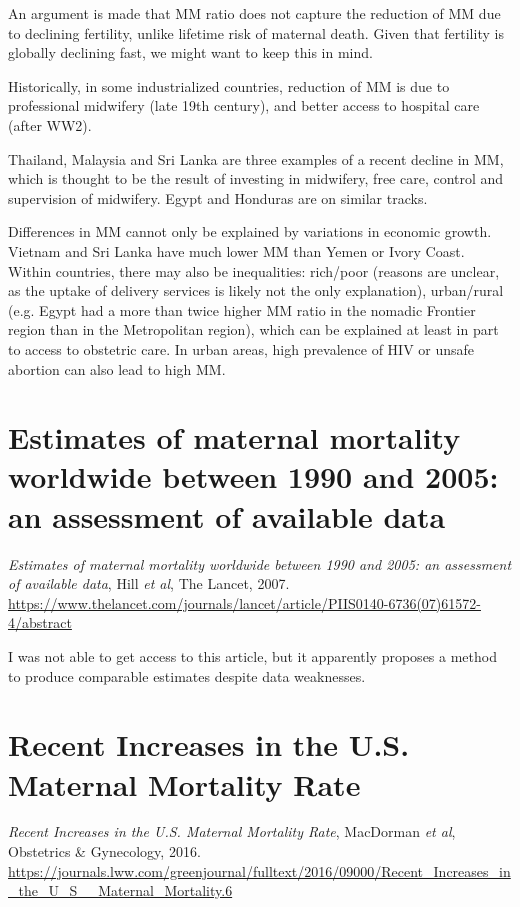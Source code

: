 \documentclass[a4paper,12pt]{article}
\begin{document}
An argument is made that MM ratio does not capture the reduction of MM due to declining fertility, unlike lifetime risk of maternal death. Given that fertility is globally declining fast, we might want to keep this in mind.

Historically, in some industrialized countries, reduction of MM is due to professional midwifery (late 19th century), and better access to hospital care (after WW2).

Thailand, Malaysia and Sri Lanka are three examples of a recent decline in MM, which is thought to be the result of investing in midwifery, free care, control and supervision of midwifery. Egypt and Honduras are on similar tracks. 

Differences in MM cannot only be explained by variations in economic growth. Vietnam and Sri Lanka have much lower MM than Yemen or Ivory Coast. Within countries, there may also be inequalities: rich/poor (reasons are unclear, as the uptake of delivery services is likely not the only explanation), urban/rural (e.g. Egypt had a more than twice higher MM ratio in the nomadic Frontier region than in the Metropolitan region), which can be explained at least in part to access to obstetric care. In urban areas, high prevalence of HIV or unsafe abortion can also lead to high MM.

\section{Estimates of maternal mortality worldwide between 1990 and 2005: an assessment of available data}

\textit{Estimates of maternal mortality worldwide between 1990 and 2005: an assessment of available data}, Hill \textit{et al}, The Lancet, 2007.\\
\url{https://www.thelancet.com/journals/lancet/article/PIIS0140-6736(07)61572-4/abstract}

I was not able to get access to this article, but it apparently proposes a method to produce comparable estimates despite data weaknesses. 

\section{Recent Increases in the U.S. Maternal Mortality Rate}

\textit{Recent Increases in the U.S. Maternal
Mortality Rate}, MacDorman \textit{et al}, Obstetrics \& Gynecology, 2016.\\
\url{https://journals.lww.com/greenjournal/fulltext/2016/09000/Recent_Increases_in_the_U_S__Maternal_Mortality.6}
\end{document}
